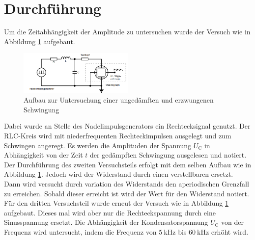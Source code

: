 \section{Durchführung}
\label{sec:Durchführung}
Um die Zeitabhängigkeit der Amplitude zu untersuchen wurde der Versuch wie in Abbildung \ref{fig:aufb a} aufgebaut.
\begin{figure}
    \centering
    \caption{Aufbau zur Untersuchung einer ungedämften und erzwungenen Schwingung \cite{}} 
    \label{fig:aufb a}
    \includegraphics[width = 0.5\textwidth]{pics/aufb.png}
\end{figure}
Dabei wurde an Stelle des Nadelimpulsgenerators ein Rechtecksignal genutzt. 
Der RLC-Kreis wird mit niederfrequenten Rechteckimpulsen ausgelegt und zum Schwingen angeregt.
Es werden die Amplituden der Spannung $U_\text{C}$ in Abhängigkeit von der Zeit $t$ der gedämpften Schwingung ausgelesen und notiert.
\\
Der Durchführung des zweiten Versuchsteils erfolgt mit dem selben Aufbau wie in Abbildung \ref{fig:aufb a}.
Jedoch wird der Widerstand durch einen verstellbaren ersetzt. Dann wird versucht durch variation des Widerstands den aperiodischen Grenzfall zu erreichen.
Sobald dieser erreicht ist wird der Wert für den Widerstand notiert.
\\
Für den dritten Versuchsteil wurde erneut der Versuch wie in Abbildung \ref{fig:aufb a} aufgebaut. Dieses mal wird aber nur die Rechteckspannung durch eine Sinusspannung ersetzt.
Die Abhängigkeit der Kondensatorspannung $U_\text{C}$ von der Frequenz wird untersucht, indem die Frequenz von $\SI{5}{\kilo \hertz}$ bis $\SI{60}{\kilo \hertz}$ erhöht wird.

